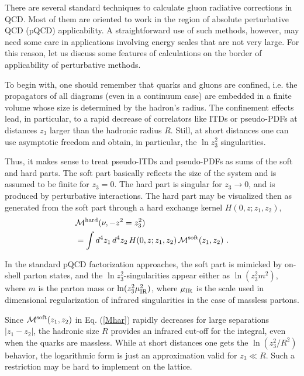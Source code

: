\documentclass[aps,prd,twocolumn,showpacs,preprintnumbers,superscriptaddress]{revtex4-1}
\newcommand{\nn}{\nonumber \\ }
\begin{document}
 There are several standard techniques to calculate gluon radiative corrections in QCD.
 Most of them  are oriented to work in the region of 
 absolute perturbative QCD (pQCD) applicability. 
A
  straightforward use of such methods, however,  
 may need some  care  in applications involving energy scales
 that are not very large.
   For this reason,  let us discuss 
   some features of calculations 
   on the border of applicability of perturbative methods. 
 

To begin with, one should  remember that quarks and gluons are confined, i.e. 
 the  propagators of all   diagrams  (even in a continuum case)
 are embedded in a finite volume whose size is determined by the hadron's radius.  
 The confinement  effects lead, in particular,
  to a rapid   decrease of  correlators like ITDs or pseudo-PDFs  at  distances $z_3$
 larger  than the  hadronic radius  $R$.
Still,  at short distances  one can  use  asymptotic freedom
 and obtain, in particular, the $\ln z_3^2$ singularities.
 
Thus, it makes sense to treat  pseudo-ITDs and  pseudo-PDFs  as  sums  of the soft and hard parts.  
The soft  part  basically 
reflects  the  size of the system  and is assumed to be  finite for $z_3=0$.   The hard part
is   singular for \mbox{$z_3 \to 0$},   and  is   produced by perturbative interactions.
The hard part may be visualized  then as
 generated from the soft part  through a hard exchange kernel $ H (0,z; z_1, z_2)$, 
\begin{align} 
    & {\cal M}^{\rm   hard} (\nu, -z^2=z_3^2)
    \nn & =   \int d^4z_1 \, d^4 z_2 \, H (0,z; z_1, z_2) \,  {\cal M}^{\rm  soft} (z_1,z_2)\  . 
\label{Mhar}
\end{align} 

In the standard  pQCD factorization approaches,
the soft part is mimicked  by on-shell parton states, and the 
\mbox{$\ln z_3^2$-singularities}  appear either as $\ln (z_3^2 m^2)$,
where $m$ is the parton mass or  $\ln (z_3^2 \mu_{\rm IR}^2)$, 
where $\mu_{\rm IR}$ is the scale used in dimensional regularization 
of infrared singularities in  the  case of massless partons. 



Since   ${\cal  M}^{\rm  soft} (z_1,z_2)$ in Eq. (\ref{Mhar}) 
rapidly decreases for large separations
$|z_1-z_2|$,  the hadronic size $R$  provides an infrared cut-off for the integral,
even when the quarks are massless.  While at   short distances   one   gets  the
 $\ln (z_3^2 / R^2)$ behavior,   the logarithmic form  is just an approximation
valid for $z_3 \ll R$. Such 
a restriction may be hard to implement on the lattice.
\end{document}
